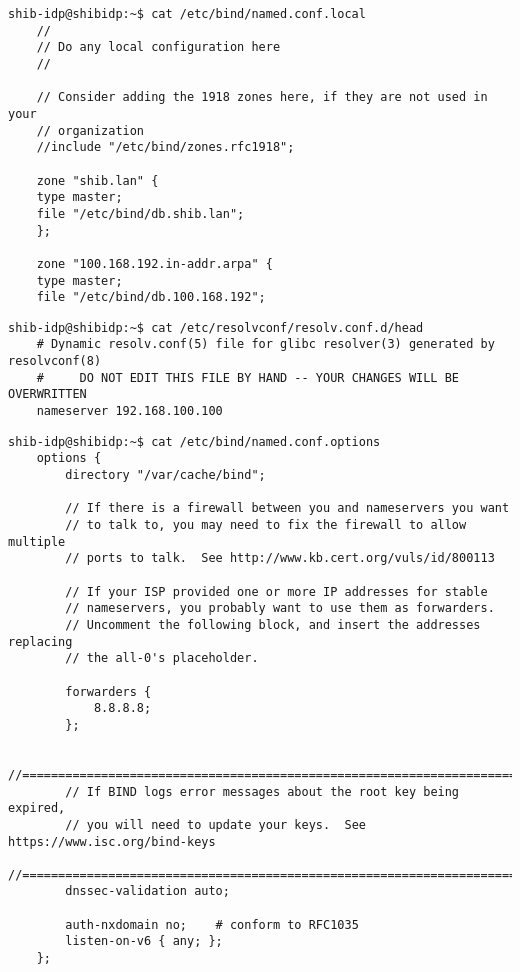 \begin{lstlisting}
shib-idp@shibidp:~$ cat /etc/bind/named.conf.local
	//
	// Do any local configuration here
	//

	// Consider adding the 1918 zones here, if they are not used in your
	// organization
	//include "/etc/bind/zones.rfc1918";

	zone "shib.lan" {
	type master;
	file "/etc/bind/db.shib.lan";
	};

	zone "100.168.192.in-addr.arpa" {
	type master;
	file "/etc/bind/db.100.168.192";
\end{lstlisting}
\begin{lstlisting}
shib-idp@shibidp:~$ cat /etc/resolvconf/resolv.conf.d/head
	# Dynamic resolv.conf(5) file for glibc resolver(3) generated by resolvconf(8)
	#     DO NOT EDIT THIS FILE BY HAND -- YOUR CHANGES WILL BE OVERWRITTEN
	nameserver 192.168.100.100
\end{lstlisting}
\begin{lstlisting}
shib-idp@shibidp:~$ cat /etc/bind/named.conf.options
	options {
		directory "/var/cache/bind";

		// If there is a firewall between you and nameservers you want
		// to talk to, you may need to fix the firewall to allow multiple
		// ports to talk.  See http://www.kb.cert.org/vuls/id/800113

		// If your ISP provided one or more IP addresses for stable
		// nameservers, you probably want to use them as forwarders.
		// Uncomment the following block, and insert the addresses replacing
		// the all-0's placeholder.

		forwarders {
			8.8.8.8;
		};

		//========================================================================
		// If BIND logs error messages about the root key being expired,
		// you will need to update your keys.  See https://www.isc.org/bind-keys
		//========================================================================
		dnssec-validation auto;

		auth-nxdomain no;    # conform to RFC1035
		listen-on-v6 { any; };
	};
\end{lstlisting}
